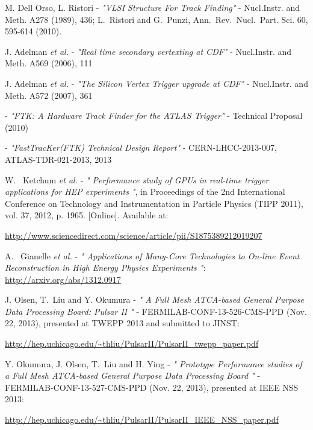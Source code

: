 \documentclass[10pt,a4paper]{article}
\begin{document}
\begin{thebibliography}{99}


 M. Dell Orso, L. Ristori - {\it "VLSI Structure For Track Finding"} - Nucl.Instr. and Meth. A278 (1989), 436; L.~Ristori and G.~Punzi, Ann.~Rev.~Nucl.~Part. Sci. 60, 595-614 (2010).

 J. Adelman {\it et al.} - {\it "Real time secondary vertexting at CDF"} - Nucl.Instr. and Meth. A569 (2006), 111

 J. Adelman {\it et al.} - {\it "The Silicon Vertex Trigger upgrade at CDF"} - Nucl.Instr. and Meth. A572 (2007), 361

  - {\it "FTK: A Hardware Track Finder for the ATLAS Trigger"} - Technical Proposal (2010)

  - {\it "FastTracKer(FTK) Technical Design Report"} - CERN-LHCC-2013-007, ATLAS-TDR-021-2013, 2013




 W. ~Ketchum {\it et al.}  - {\it "
Performance study of GPUs in real-time trigger applications for HEP experiments
"}, in Proceedings of the 2nd International Conference on Technology and Instrumentation in Particle Physics (TIPP 2011), vol. 37, 2012, p. 1965. [Online]. 
Available at: 

\url{http://www.sciencedirect.com/science/article/pii/S1875389212019207}


 A. ~Gianelle {\it et al.}  - {\it "
Applications of Many-Core Technologies to On-line Event Reconstruction in High Energy Physics Experiments
"}:
\url{http://arxiv.org/abs/1312.0917}



 J. Olsen, T.~Liu and Y. Okumura - {\it "
A Full Mesh ATCA-based General Purpose Data Processing Board: Pulsar II
"} - FERMILAB-CONF-13-526-CMS-PPD (Nov. 22, 2013), presented at TWEPP 2013 and submitted to JINST:

\url{http://hep.uchicago.edu/~thliu/PulsarII/PulsarII_twepp_paper.pdf}

 Y. Okumura, J. Olsen, T.~Liu and H. Ying - {\it "
Prototype Performance studies of a Full Mesh ATCA-based General Purpose Data Processing Board
"} - FERMILAB-CONF-13-527-CMS-PPD (Nov. 22, 2013), presented at IEEE NSS 2013: 

\url{http://hep.uchicago.edu/~thliu/PulsarII/PulsarII_IEEE_NSS_paper.pdf}


\end{thebibliography}
\end{document}

